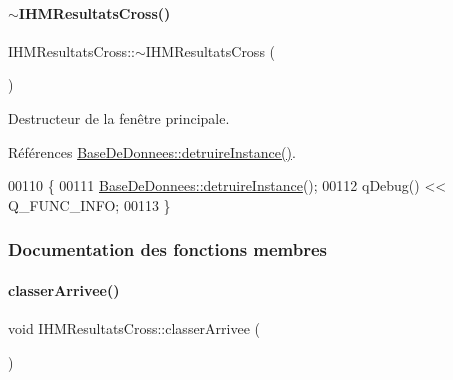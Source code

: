 \mbox{\label{class_i_h_m_resultats_cross_a62afe926862fddcb340e4a2c57c3cddf}} 
\paragraph{\texorpdfstring{$\sim$\+I\+H\+M\+Resultats\+Cross()}{~IHMResultatsCross()}}
{\footnotesize\ttfamily I\+H\+M\+Resultats\+Cross\+::$\sim$\+I\+H\+M\+Resultats\+Cross (\begin{DoxyParamCaption}{ }\end{DoxyParamCaption})}



Destructeur de la fenêtre principale. 



Références \hyperlink{class_base_de_donnees_a457401c0816b888c77ce915997545f4e}{Base\+De\+Donnees\+::detruire\+Instance()}.


\begin{DoxyCode}
00110 \{
00111     \hyperlink{class_base_de_donnees_a457401c0816b888c77ce915997545f4e}{BaseDeDonnees::detruireInstance}();
00112     qDebug() << Q\_FUNC\_INFO;
00113 \}
\end{DoxyCode}


\subsubsection{Documentation des fonctions membres}
\mbox{\label{class_i_h_m_resultats_cross_a4311c35a2869a24be1a06d7410623eda}} 
\paragraph{\texorpdfstring{classer\+Arrivee()}{classerArrivee()}\hspace{0.1cm}{\footnotesize\ttfamily [1/2]}}
{\footnotesize\ttfamily void I\+H\+M\+Resultats\+Cross\+::classer\+Arrivee (\begin{DoxyParamCaption}{ }\end{DoxyParamCaption})}

